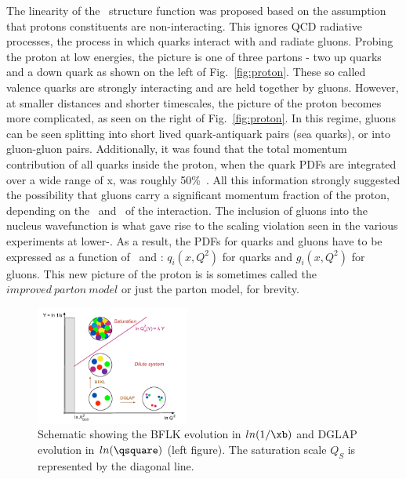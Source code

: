 The linearity of the \ftwo\ structure function was proposed based on the assumption that protons constituents are non-interacting. This ignores QCD radiative processes, the process in which quarks interact with and radiate gluons. Probing the proton at low energies, the picture is one of three partons - two up quarks and a down quark as shown on the left of Fig.~\ref{fig:proton}. These so called valence quarks are strongly interacting and are held together by gluons. However, at smaller distances and shorter timescales, the picture of the proton becomes more complicated, as seen on the right of Fig.~\ref{fig:proton}. In this regime, gluons can be seen splitting into short lived quark-antiquark pairs (sea quarks), or into gluon-gluon pairs. Additionally, it was found that the total momentum contribution of all quarks inside the proton, when the quark PDFs are integrated over a wide range of x, was roughly 50\%~\cite{qcdbook}. All this information strongly suggested the possibility that gluons carry a significant momentum fraction of the proton, depending on the \xb\ and \qsquare\ of the interaction. The inclusion of gluons into the nucleus wavefunction is what gave rise to the scaling violation seen in the various experiments at lower-\xb. As a result, the PDFs for quarks and gluons have to be expressed as a function of \xb\ and \qsquare: $q_{i}(x,Q^{2})$ for quarks and $g_{i}(x,Q^{2})$ for gluons. This new picture of the proton is is sometimes called the $improved\ parton\ model$ or just the parton model, for brevity.

\begin{figure}
	\centering
	\includegraphics[width=0.45\textwidth]{figures/dglap_bfkl.pdf} 
	\caption{ Schematic showing the BFLK evolution in $ln(1/\xb)$ and DGLAP evolution in $ln(\qsquare)$ (left figure). The saturation scale $Q_{S}$ is represented by the diagonal line.}	
	\label{fig:cgc}
\end{figure}


